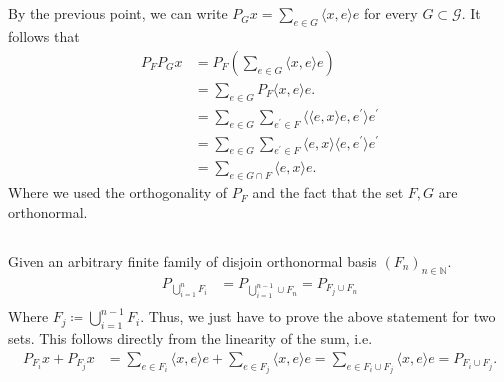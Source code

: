 \documentclass[a4paper,12pt]{article} %
\begin{document}
\subsection{}
By the previous point, we can write \(P_G x = \sum_{e \in  G}\langle x,e \rangle e \) for every \(G \subset \mathcal{G}\).
It follows that
\begin{align*}
    P_F P_G x & = P_F \left( \sum_{e \in  G}\langle x,e \rangle e  \right)
    \\
              & = \sum_{e \in  G} P_F \langle x,e \rangle e.                                                                \\
              & = \sum_{e \in  G} \sum_{e^{\prime}  \in F} \langle \langle e, x \rangle e, e^{\prime}  \rangle e^{\prime}   \\
              & = \sum_{e \in  G} \sum_{e^{\prime}  \in F}   \langle e, x \rangle \langle e, e^{\prime}  \rangle e^{\prime} \\
              & = \sum_{e \in  G \cap F}\langle e, x \rangle  e .
\end{align*}
Where we used the orthogonality of \(P_F\) and the fact that the set \(F,G\) are orthonormal.



\subsection{}
Given an arbitrary finite family of disjoin orthonormal basis \((F_n)_{n \in \mathbb{N}}\).
\begin{align*}
    P_{\bigcup_{i=1}^{n} F_i } & = P_{\bigcup_{i=1}^{n-1}  \cup F_n} = P_{F_j \cup F_n} \\
\end{align*}
Where \(F_j \coloneqq  \bigcup_{i=1}^{n-1}F_i \). Thus, we just have to prove the above statement for two sets. This follows directly from the linearity of the sum, i.e.
\begin{align*}
    P_{F_i}x + P_{F_j}x & = \sum_{e \in F_i} \langle x,e \rangle e + \sum_{e \in  F_j} \langle x, e \rangle e = \sum_{e \in  F_i \cup F_j}\langle x,e \rangle e= P_{F_i \cup F_j}.
\end{align*}
\end{document}
